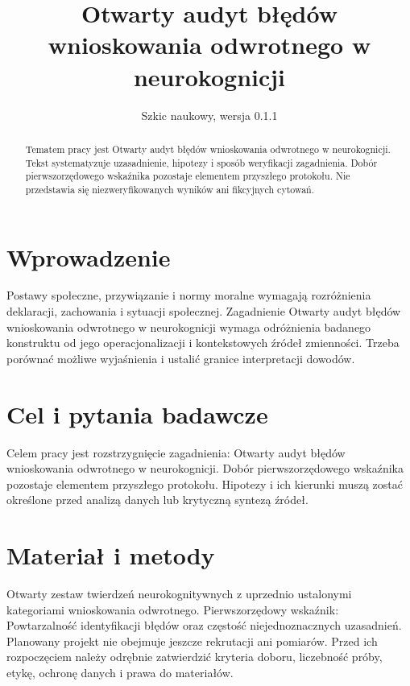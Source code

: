\documentclass[11pt,a4paper]{article}
\title{Otwarty audyt błędów wnioskowania odwrotnego w neurokognicji}
\author{}
\date{Szkic naukowy, wersja 0.1.1}
\begin{document}
\maketitle

\begin{abstract}

Tematem pracy jest Otwarty audyt błędów wnioskowania odwrotnego w neurokognicji. Tekst systematyzuje uzasadnienie, hipotezy i sposób weryfikacji zagadnienia. Dobór pierwszorzędowego wskaźnika pozostaje elementem przyszłego protokołu. Nie przedstawia się niezweryfikowanych wyników ani fikcyjnych cytowań.

\end{abstract}

\section{Wprowadzenie}

Postawy społeczne, przywiązanie i normy moralne wymagają rozróżnienia deklaracji, zachowania i sytuacji społecznej. Zagadnienie Otwarty audyt błędów wnioskowania odwrotnego w neurokognicji wymaga odróżnienia badanego konstruktu od jego operacjonalizacji i kontekstowych źródeł zmienności. Trzeba porównać możliwe wyjaśnienia i ustalić granice interpretacji dowodów.

\section{Cel i pytania badawcze}

Celem pracy jest rozstrzygnięcie zagadnienia: Otwarty audyt błędów wnioskowania odwrotnego w neurokognicji. Dobór pierwszorzędowego wskaźnika pozostaje elementem przyszłego protokołu. Hipotezy i ich kierunki muszą zostać określone przed analizą danych lub krytyczną syntezą źródeł.

\section{Materiał i metody}

Otwarty zestaw twierdzeń neurokognitywnych z uprzednio ustalonymi kategoriami wnioskowania odwrotnego. Pierwszorzędowy wskaźnik: Powtarzalność identyfikacji błędów oraz częstość niejednoznacznych uzasadnień. Planowany projekt nie obejmuje jeszcze rekrutacji ani pomiarów. Przed ich rozpoczęciem należy odrębnie zatwierdzić kryteria doboru, liczebność próby, etykę, ochronę danych i prawa do materiałów.
\end{document}
